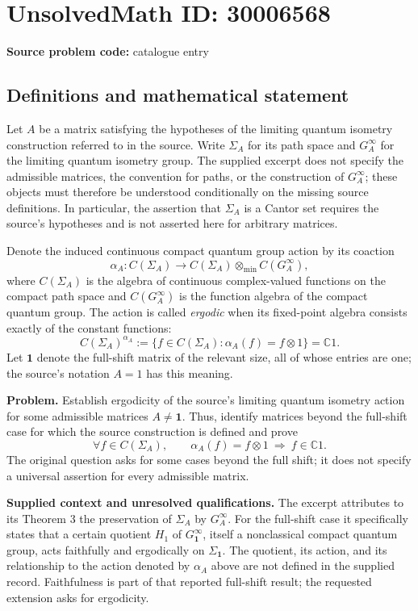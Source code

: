 \documentclass[11pt]{article}
\begin{document}
\section*{UnsolvedMath ID: 30006568}
\textbf{Source problem code:} catalogue entry
\subsection{Definitions and mathematical statement}
Let \(A\) be a matrix satisfying the hypotheses of the limiting quantum isometry construction referred to in the source. Write \(\Sigma_A\) for its path space and \(G_A^\infty\) for the limiting quantum isometry group. The supplied excerpt does not specify the admissible matrices, the convention for paths, or the construction of \(G_A^\infty\); these objects must therefore be understood conditionally on the missing source definitions. In particular, the assertion that \(\Sigma_A\) is a Cantor set requires the source's hypotheses and is not asserted here for arbitrary matrices.

Denote the induced continuous compact quantum group action by its coaction
\[
\alpha_A:C(\Sigma_A)\longrightarrow C(\Sigma_A)\otimes_{\min}C(G_A^\infty),
\]
where \(C(\Sigma_A)\) is the algebra of continuous complex-valued functions on the compact path space and \(C(G_A^\infty)\) is the function algebra of the compact quantum group. The action is called \emph{ergodic} when its fixed-point algebra consists exactly of the constant functions:
\[
C(\Sigma_A)^{\alpha_A}
:=\{f\in C(\Sigma_A):\alpha_A(f)=f\otimes 1\}
=\mathbb C1.
\]
Let \(\mathbf 1\) denote the full-shift matrix of the relevant size, all of whose entries are one; the source's notation \(A=1\) has this meaning.

\textbf{Problem.} Establish ergodicity of the source's limiting quantum isometry action for some admissible matrices \(A\ne\mathbf 1\). Thus, identify matrices beyond the full-shift case for which the source construction is defined and prove
\[
\forall f\in C(\Sigma_A),\qquad
\alpha_A(f)=f\otimes1
\ \Longrightarrow\ 
f\in\mathbb C1.
\]
The original question asks for some cases beyond the full shift; it does not specify a universal assertion for every admissible matrix.

\textbf{Supplied context and unresolved qualifications.} The excerpt attributes to its Theorem 3 the preservation of \(\Sigma_A\) by \(G_A^\infty\). For the full-shift case it specifically states that a certain quotient \(H_1\) of \(G_{\mathbf 1}^\infty\), itself a nonclassical compact quantum group, acts faithfully and ergodically on \(\Sigma_{\mathbf 1}\). The quotient, its action, and its relationship to the action denoted by \(\alpha_A\) above are not defined in the supplied record. Faithfulness is part of that reported full-shift result; the requested extension asks for ergodicity.
\end{document}
